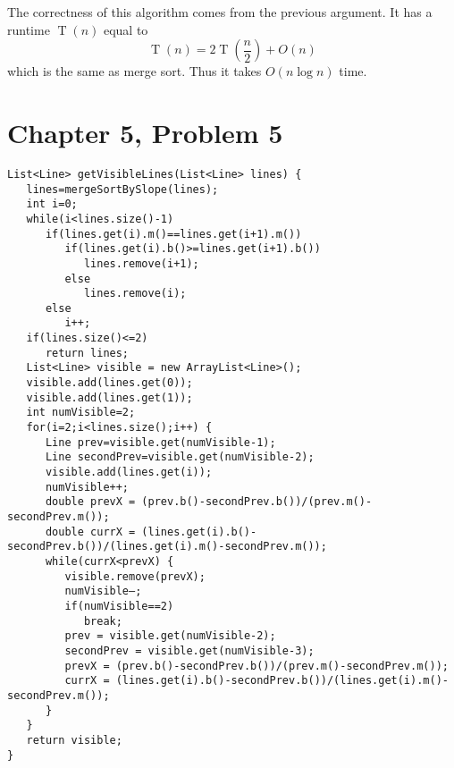 \documentclass[12pt]{article}
\begin{document}
The correctness of this algorithm comes from the previous argument. It has a runtime \(\operatorname{T}(n)\) equal to
\[\operatorname{T}(n)=2\operatorname{T}\left(\frac{n}{2}\right)+O(n)\]
which is the same as merge sort. Thus it takes \(O(n\log n)\) time.

\pagebreak

\section*{Chapter 5, Problem 5}

\begin{verbatim}
List<Line> getVisibleLines(List<Line> lines) {
   lines=mergeSortBySlope(lines);
   int i=0;
   while(i<lines.size()-1)
      if(lines.get(i).m()==lines.get(i+1).m())
         if(lines.get(i).b()>=lines.get(i+1).b())
            lines.remove(i+1);
         else
            lines.remove(i);
      else
         i++;
   if(lines.size()<=2)
      return lines;
   List<Line> visible = new ArrayList<Line>();
   visible.add(lines.get(0));
   visible.add(lines.get(1));
   int numVisible=2;
   for(i=2;i<lines.size();i++) {
      Line prev=visible.get(numVisible-1);
      Line secondPrev=visible.get(numVisible-2);
      visible.add(lines.get(i));
      numVisible++;
      double prevX = (prev.b()-secondPrev.b())/(prev.m()-secondPrev.m());
      double currX = (lines.get(i).b()-secondPrev.b())/(lines.get(i).m()-secondPrev.m());
      while(currX<prevX) {
         visible.remove(prevX);
         numVisible—;
         if(numVisible==2)
            break;
         prev = visible.get(numVisible-2);
         secondPrev = visible.get(numVisible-3);
         prevX = (prev.b()-secondPrev.b())/(prev.m()-secondPrev.m());
         currX = (lines.get(i).b()-secondPrev.b())/(lines.get(i).m()-secondPrev.m());
      }
   }
   return visible;
}
\end{verbatim}

\pagebreak
\end{document}
